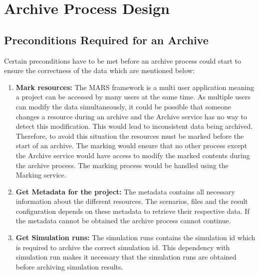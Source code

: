 \section{Archive Process Design}
\subsection{Preconditions Required for an Archive}
Certain preconditions have to be met before an archive process could start to ensure the correctness of the data which are mentioned below:
\begin{enumerate}
    \label{lst:preconditionsArchive}
    \item \textbf{Mark resources:} The MARS framework is a multi user application meaning a project can be accessed by many users at the same time. 
    As multiple users can modify the data simultaneously, it could be possible that someone changes a resource during an archive and the 
    Archive service has no way to detect this modification. This would lead to inconsistent data being archived.
    Therefore, to avoid this situation the resources must be marked before the start of an archive. The marking would ensure that no other process except the Archive
    service would have access to modify the marked contents during the archive process. The marking process would be handled using the Marking service.
    \item \textbf{Get Metadata for the project:} The metadata contains all necessary information about
    the different resources. The scenarios, files and the result configuration depends on these metadata
    to retrieve their respective data. If the metadata cannot be obtained the archive process cannot continue.
    \item \textbf{Get Simulation runs:} The simulation runs contains the simulation id which is required to archive the correct simulation id. This dependency
    with simulation run makes it necessary that the simulation runs are obtained before archiving simulation results.
\end{enumerate}

